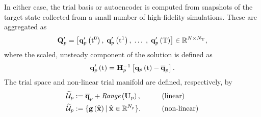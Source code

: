 %
In either case, the trial basis or autoencoder is computed from snapshots of the target state collected from a small number of high-fidelity simulations. These are aggregated as
%
\begin{equation}\label{eq:primSnapMat}
	\primDataMatUns = \left[ \primFuncUns{\initTime}, \; \primFuncUns{\timeVar^1}, \; \hdots \; , \; \primFuncUns{\finalTime} \right] \inRTwo{\numDOF}{\numSnaps},
\end{equation}
%
where the scaled, unsteady component of the solution is defined as
%
\begin{equation}\label{eq:primUns}
	\primFuncUns{\timeVar} = \primScaleInv \left[\primFunc{\timeVar} - \primVecCent\right].
\end{equation}
%
The trial space and non-linear trial manifold are defined, respectively, by
%
\begin{alignat}{2}
    \primTrialSpace &\defEq \primVecCent + \textit{Range}\left(\primTrial\right), \qquad &&\text{(linear)}\\
    \primTrialSpace &\defEq \{\decoderFunc{\nnInputCoef} \vert \; \nnInputCoef \inROne{\numPrimModes} \}. \qquad &&\text{(non-linear)}
\end{alignat}
%

